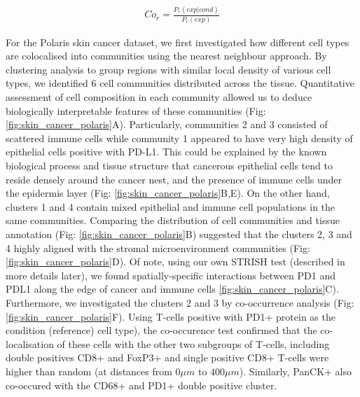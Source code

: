 \begin{align}
\label{Eq:Cooc_equation}
Co_{r} = \frac{P_{r}(exp|cond)}{P_{r}(exp)} 
\end{align}

For the Polaris skin cancer dataset, we first investigated how different cell types are colocalised into communities using the nearest neighbour approach. By clustering analysis to group regions with similar local density of various cell types, we identified 6 cell communities distributed across the tissue. Quantitative assessment of cell composition in each community allowed us to deduce biologically interpretable features of these communities (Fig: \ref{fig:skin_cancer_polaris}A). Particularly, communities 2 and 3 consisted of scattered immune cells while community 1 appeared to have very high density of epithelial cells positive with PD-L1. This could be explained by the known biological process and tissue structure that cancerous epithelial cells tend to reside densely around the cancer nest, and the presence of immune cells under the epidermis layer (Fig: \ref{fig:skin_cancer_polaris}B,E). On the other hand, clusters 1 and 4 contain mixed epithelial and immune cell populations in the same communities. Comparing the distribution of cell communities and tissue annotation (Fig: \ref{fig:skin_cancer_polaris}B) suggested that the clusters 2, 3 and 4 highly aligned with the stromal microenvironment communities (Fig: \ref{fig:skin_cancer_polaris}D).  Of note, using our own STRISH test (described in more details later), we found spatially-specific interactions between PD1 and PDL1 along the edge of cancer and immune cells \ref{fig:skin_cancer_polaris}C). Furthermore, we investigated the clusters 2 and 3 by co-occurrence analysis (Fig: \ref{fig:skin_cancer_polaris}F). Using T-cells positive with PD1+ protein as the condition (reference) cell type), the co-occurence test confirmed that the co-localisation of these cells with the other two subgroups of T-cells, including double positives CD8+ and FoxP3+ and single positive CD8+ T-cells were higher than random (at distances from $0\mu m$ to $400 \mu m$). Similarly, PanCK+ also co-occured with the CD68+ and PD1+ double positive cluster.       

